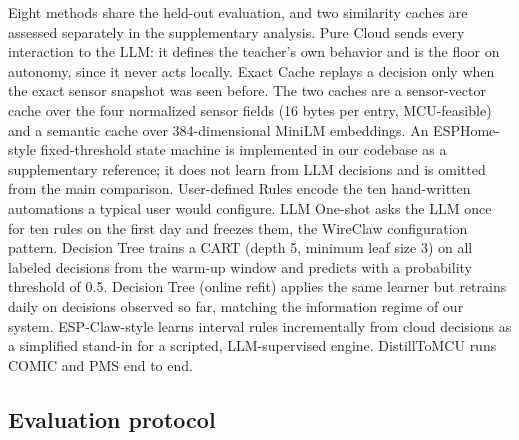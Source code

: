 \documentclass[review]{elsarticle}
\begin{document}
Eight methods share the held-out evaluation, and two similarity caches are
assessed separately in the supplementary analysis. Pure Cloud sends every
interaction to the LLM: it defines the teacher's own behavior and is the floor
on autonomy, since it never acts locally.
Exact Cache replays a decision only when the exact sensor snapshot was seen
before. The two caches are a sensor-vector cache over the four normalized
sensor fields (16 bytes per entry, MCU-feasible) and a semantic cache over
384-dimensional MiniLM embeddings. An ESPHome-style fixed-threshold state
machine is implemented in our codebase as a supplementary reference; it does
not learn from LLM decisions and is omitted from the main comparison.
User-defined Rules encode the ten hand-written automations a
typical user would configure. LLM One-shot asks the LLM once for ten
rules on the first day and freezes them, the WireClaw configuration pattern.
Decision Tree trains a CART (depth 5, minimum leaf size 3) on all labeled
decisions from the warm-up window and predicts with a probability threshold
of 0.5. Decision Tree (online refit) applies the same learner but retrains
daily on decisions observed so far, matching the information regime of our
system. ESP-Claw-style learns interval rules incrementally from cloud
decisions as a simplified stand-in for a scripted, LLM-supervised engine.
DistillToMCU runs COMIC and PMS end to end.

\subsection{Evaluation protocol}
\end{document}
